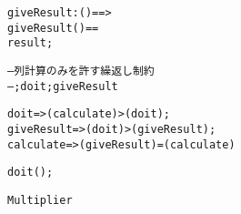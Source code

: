 \documentclass[\pformat,12pt]{jarticle}
\begin{document}
\begin{description}
\begin{alltt}
     giveResult : () ==> 
    giveResult() ==  
       result;

    -- 列計算のみを許す繰返し制約
    -- ; doit; giveResult

     doit =>  (calculate) > (doit);
     giveResult =>  (doit) >  (giveResult);
     calculate =>  (giveResult) =  (calculate)

      doit();

     Multiplier
\end{alltt}

%

\end{description}
\end{document}
